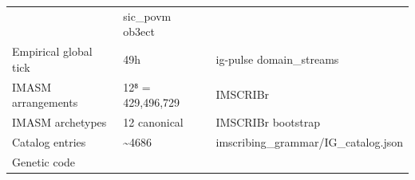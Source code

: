 \begin{longtable}[]{@{}lll@{}}
\begin{minipage}[t]{0.28\columnwidth}
\end{minipage} & \begin{minipage}[t]{0.32\columnwidth}\raggedright
sic\_povm ob3ect\strut
\end{minipage}\tabularnewline
\begin{minipage}[t]{0.32\columnwidth}\raggedright
Empirical global tick\strut
\end{minipage} & \begin{minipage}[t]{0.28\columnwidth}\raggedright
49h\strut
\end{minipage} & \begin{minipage}[t]{0.32\columnwidth}\raggedright
ig-pulse domain\_streams\strut
\end{minipage}\tabularnewline
\begin{minipage}[t]{0.32\columnwidth}\raggedright
IMASM arrangements\strut
\end{minipage} & \begin{minipage}[t]{0.28\columnwidth}\raggedright
12⁸ = 429,496,729\strut
\end{minipage} & \begin{minipage}[t]{0.32\columnwidth}\raggedright
IMSCRIBr\strut
\end{minipage}\tabularnewline
\begin{minipage}[t]{0.32\columnwidth}\raggedright
IMASM archetypes\strut
\end{minipage} & \begin{minipage}[t]{0.28\columnwidth}\raggedright
12 canonical\strut
\end{minipage} & \begin{minipage}[t]{0.32\columnwidth}\raggedright
IMSCRIBr bootstrap\strut
\end{minipage}\tabularnewline
\begin{minipage}[t]{0.32\columnwidth}\raggedright
Catalog entries\strut
\end{minipage} & \begin{minipage}[t]{0.28\columnwidth}\raggedright
\textasciitilde4686\strut
\end{minipage} & \begin{minipage}[t]{0.32\columnwidth}\raggedright
imscribing\_grammar/IG\_catalog.json\strut
\end{minipage}\tabularnewline
\begin{minipage}[t]{0.32\columnwidth}\raggedright
Genetic code\strut
\end{minipage} & \begin{minipage}[t]{0.28\columnwidth}\raggedright

\end{minipage}
\end{longtable}
